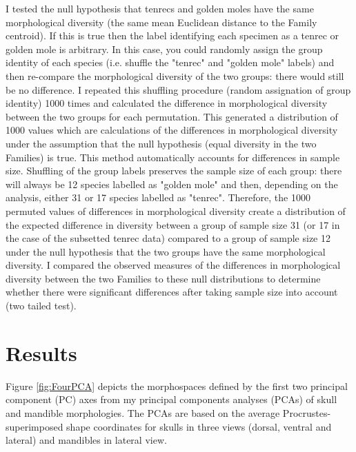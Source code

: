 	I tested the null hypothesis that tenrecs and golden moles have the same morphological diversity (the same mean Euclidean distance to the Family centroid). If this is true then the label identifying each specimen as a tenrec or golden mole is arbitrary. In this case, you could randomly assign the group identity of each species (i.e. shuffle the "tenrec" and "golden mole" labels) and then re-compare the morphological diversity of the two groups: there would still be no difference. I repeated this shuffling procedure (random assignation of group identity) 1000 times and calculated the difference in morphological diversity between the two groups for each permutation. This generated a distribution of 1000 values which are calculations of the differences in morphological diversity under the assumption that the null hypothesis (equal diversity in the two Families) is true. This method automatically accounts for differences in sample size. Shuffling of the group labels preserves the sample size of each group: there will always be 12 species labelled as "golden mole" and then, depending on the analysis, either 31 or 17 species labelled as "tenrec". Therefore, the 1000 permuted values of differences in morphological diversity create a distribution of the expected difference in diversity between a group of sample size 31 (or 17 in the case of the subsetted tenrec data) compared to a group of sample size 12 under the null hypothesis that the two groups have the same morphological diversity. I compared the observed measures of the differences in morphological diversity between the two Families to these null distributions to determine whether there were significant differences after taking sample size into account (two tailed test).


	
\newpage
\section{Results}
\label{sect:results}

	Figure \ref{fig:FourPCA} depicts the morphospaces defined by the first two principal component (PC) axes from my principal components analyses (PCAs) of skull and mandible morphologies. The PCAs are based on the average Procrustes-superimposed shape coordinates for skulls in three views (dorsal, ventral and lateral) and mandibles in lateral view.

